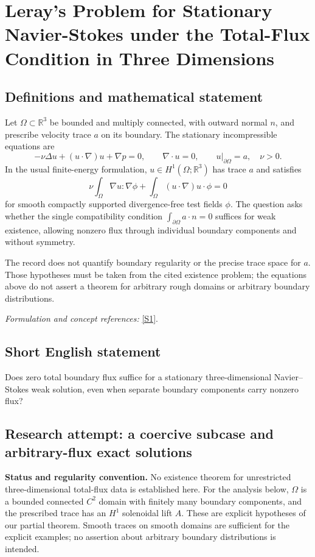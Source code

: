 \documentclass[11pt]{article}
\begin{document}
\section*{\texorpdfstring{Leray's Problem for Stationary Navier-Stokes under the Total-Flux Condition in Three Dimensions}{Leray's Problem for Stationary Navier-Stokes under the Total-Flux Condition in Three Dimensions}}\label{461}
\subsection{Definitions and mathematical statement}
Let $\Omega\subset{\mathbb{R}}^3$ be bounded and multiply connected, with outward normal $n$, and prescribe velocity trace $a$ on its boundary. The stationary incompressible equations are
\[
 -\nu\Delta u+(u\cdot\nabla)u+\nabla p=0,
 \qquad\nabla\cdot u=0,\qquad u|_{\partial\Omega}=a,
 \quad\nu>0.
\]
In the usual finite-energy formulation, $u\in H^1(\Omega;{\mathbb{R}}^3)$ has trace $a$ and satisfies
\[
 \nu\int_\Omega\nabla u:\nabla\phi
 +\int_\Omega (u\cdot\nabla)u\cdot\phi=0
\]
for smooth compactly supported divergence-free test fields $\phi$. The question asks whether the single compatibility condition $\int_{\partial\Omega}a\cdot n=0$ suffices for weak existence, allowing nonzero flux through individual boundary components and without symmetry.

The record does not quantify boundary regularity or the precise trace space for $a$. Those hypotheses must be taken from the cited existence problem; the equations above do not assert a theorem for arbitrary rough domains or arbitrary boundary distributions.
\par\smallskip\textit{Formulation and concept references:} \href{https://ejde.math.txstate.edu/Volumes/2023/26/foreidooni.pdf}{[S1]}.

\subsection{Short English statement}
Does zero total boundary flux suffice for a stationary three-dimensional Navier--Stokes weak solution, even when separate boundary components carry nonzero flux?
\subsection{Research attempt: a coercive subcase and arbitrary-flux exact solutions}
\textbf{Status and regularity convention.} No existence theorem for unrestricted three-dimensional total-flux data is established here. For the analysis below, $\Omega$ is a bounded connected $C^2$ domain with finitely many boundary components, and the prescribed trace has an $H^1$ solenoidal lift $A$. These are explicit hypotheses of our partial theorem. Smooth traces on smooth domains are sufficient for the explicit examples; no assertion about arbitrary boundary distributions is intended.
\end{document}
